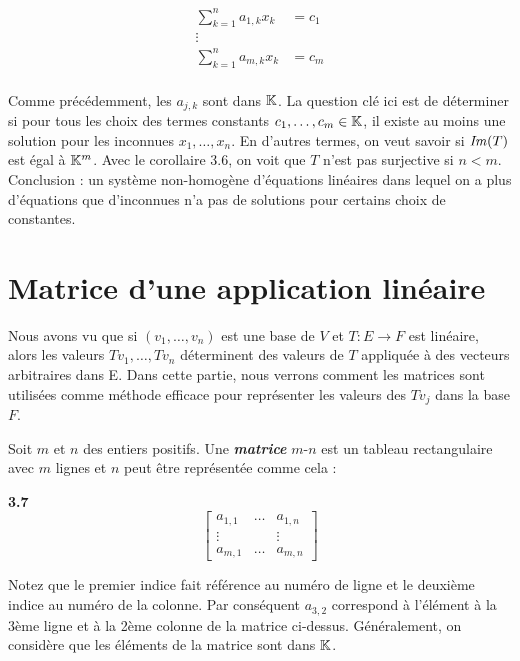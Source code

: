 \documentclass[12pt]{book}
\begin{document}
\begin{equation*}
    \begin{split}
    \sum_{k=1}^na_{1,k}x_k& = c_1\\
    \vdots&\\
    \sum_{k=1}^na_{m,k}x_k& = c_m\\
    \end{split}
\end{equation*}

\noindent
Comme précédemment, les $a_{j,k}$ sont dans $\mathbb{K}$. La question clé ici est de déterminer si pour tous les choix des termes constants $c_1,\ldots,c_m\in\mathbb{K}$, il existe au moins une solution pour les inconnues $x_1,\ldots,x_n$. En d'autres termes, on veut savoir si $\textrm{\textit{Im}}(T)$ est égal à $\mathbb{K}^m$. Avec le corollaire 3.6, on voit que $T$ n'est pas surjective si $n<m$. Conclusion : un système non-homogène d'équations linéaires dans lequel on a plus d'équations que d'inconnues n'a pas de solutions pour certains choix de constantes. 

\newpage
\section*{Matrice d'une application linéaire}

Nous avons vu que si $(v_1,\ldots,v_n)$ est une base de $V$ et $T\colon E\rightarrow F$ est linéaire, alors les valeurs $Tv_1,\ldots,Tv_n$ déterminent des valeurs de $T$ appliquée à des vecteurs arbitraires dans E. Dans cette partie, nous verrons comment les matrices sont utilisées comme méthode efficace pour représenter les valeurs des $Tv_j$ dans la base $F$.

Soit $m$ et $n$ des entiers positifs. Une \textbf{\textit{matrice}} $m$-$n$ est un tableau rectangulaire avec $m$ lignes et $n$ peut être représentée comme cela :

\begin{center}
\textbf{3.7}
\begin{equation*}
\begin{bmatrix}
    a_{1,1} & \ldots & a_{1,n}\\
    \vdots & & \vdots\\
    a_{m,1} & \ldots & a_{m,n}
\end{bmatrix}
\end{equation*}
\end{center}

Notez que le premier indice fait référence au numéro de ligne et le deuxième indice au numéro de la colonne. Par conséquent $a_{3,2}$ correspond à l'élément à la 3ème ligne et à la 2ème colonne de la matrice ci-dessus. Généralement, on considère que les éléments de la matrice sont dans $\mathbb{K}$. 
\end{document}
